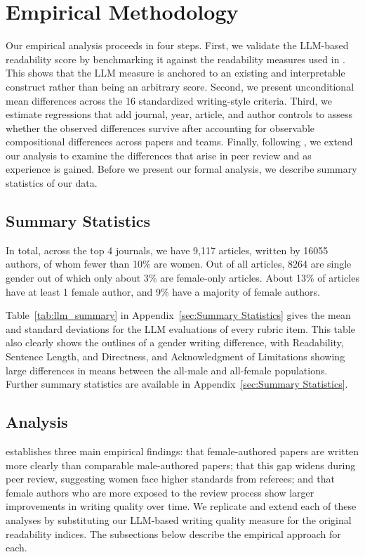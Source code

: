 \section{Empirical Methodology}\label{sec:method}


Our empirical analysis proceeds in four steps. First, we validate the LLM-based readability score by benchmarking it against the readability measures used in \cite{hengel2022publishing}. This shows that the LLM measure is anchored to an existing and interpretable construct rather than being an arbitrary score. Second, we present unconditional mean differences across the 16 standardized writing-style criteria. Third, we estimate regressions that add journal, year, article, and author controls to assess whether the observed differences survive after accounting for observable compositional differences across papers and teams. Finally, following \cite{hengel2022publishing}, we extend our analysis to examine the differences that arise in peer review and as experience is gained. Before we present our formal analysis, we describe summary statistics of our data.

\subsection{Summary Statistics}\label{sec:summary_stats}

In total, across the top 4 journals, we have 9,117 articles, written by 16055 authors, of whom fewer than 10\% are women. Out of all articles, 8264 are single gender out of which only about 3\% are female-only articles. About 13\% of articles have at least 1 female author, and 9\% have a majority of female authors.

Table~\ref{tab:llm_summary} in Appendix~\ref{sec:Summary Statistics} gives the mean and standard deviations for the LLM evaluations of every rubric item. This table also clearly shows the outlines of a gender writing difference, with Readability, Sentence Length, and Directness, and Acknowledgment of Limitations showing large differences in means between the all-male and all-female populations. Further summary statistics are available in Appendix~\ref{sec:Summary Statistics}.

\subsection{Analysis}\label{sec:analysis}

\textcite{hengel2022publishing} establishes three main empirical findings: that female-authored papers are written more clearly than comparable male-authored papers; that this gap widens during peer review, suggesting women face higher standards from referees; and that female authors who are more exposed to the review process show larger improvements in writing quality over time. We replicate and extend each of these analyses by substituting our LLM-based writing quality measure for the original readability indices. The subsections below describe the empirical approach for each.

